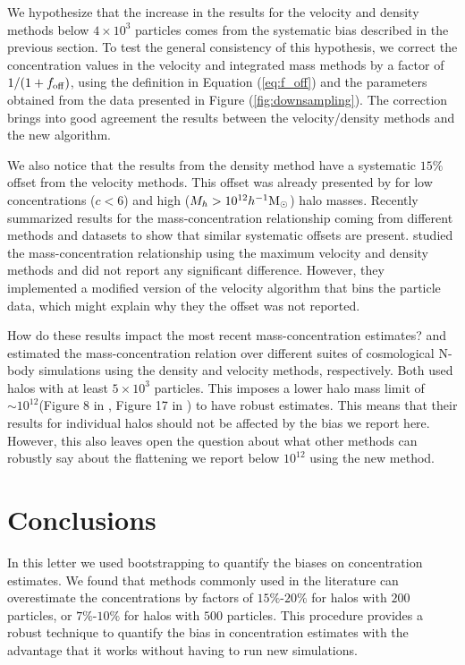 \documentclass{emulateapj}
\newcommand{\hMsun}{{\ifmmode{h^{-1}{\rm {M_{\odot}}}}\else{$h^{-1}{\rm{M_{\odot}}}$}\fi}}
\newcommand{\Msun}{{\ifmmode{{\rm {M_{\odot}}}}\else{${\rm{M_{\odot}}}$}\fi}}
\begin{document}
We hypothesize that the increase in the results for the velocity
and density methods below $4\times 10^{3}$ particles comes from the
systematic bias described in the previous section.  
To test the general consistency of this hypothesis, we correct the
concentration values in the velocity and integrated mass methods by a
factor of $1/(1+f_{\rm  off})$, using the definition in Equation
(\ref{eq:f_off}) and the  
parameters obtained from the data presented in Figure
(\ref{fig:downsampling}).  
The correction brings into good agreement the results between the
velocity/density methods and the new algorithm.

We also notice that the results from the density method have a
systematic $15\%$ offset from the velocity methods.  
This offset was already presented by \cite{Prada2012} for low
concentrations ($c<6$) and high ($M_h>10^{12}\hMsun$) halo masses.  
Recently \citep{Klypin2016} summarized results for the
mass-concentration relationship coming from different methods and
datasets to show that similar systematic offsets are present.
\citep{2014MNRAS.441.3359D} studied the mass-concentration
relationship using the maximum velocity and density methods and did
not report any significant difference. 
However, they implemented a modified version of the velocity algorithm
that bins the particle data, which might explain why they the offset
was not reported.

How do these results impact the most recent mass-concentration estimates? 
\cite{Ludlow2016} and \cite{Klypin2016} estimated the mass-concentration
relation over different suites of cosmological N-body simulations using the
density and velocity methods, respectively. 
Both used halos with at least $5\times 10^{3}$ particles.
This imposes a lower halo mass limit of $\sim 10^{12}$\hMsun (Figure 8
in \cite{Ludlow2016}, Figure 17 in \cite{Klypin2016}) to have robust
estimates. 
This means that their results for individual halos should not be
affected by the bias we report here.
However, this also leaves open the question about what other methods
can robustly say about the flattening we report below $10^{12}$\Msun
using the new method. 



\section{Conclusions}
\label{sec:conclusions}

In this letter we used bootstrapping to quantify the biases on
concentration estimates. 
We found that methods commonly used in the literature can overestimate
the concentrations by factors of $15\%$-$20\%$ for halos with $200$
particles, or $7\%$-$10\%$ for halos with $500$ particles.  
This procedure provides a robust technique to quantify the bias in
concentration estimates with the advantage that it works without
having to run new simulations. 
\end{document}
